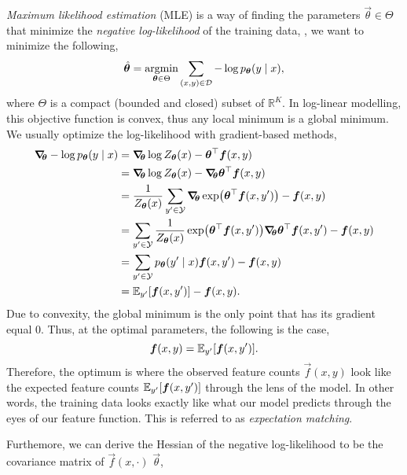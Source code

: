 \textit{Maximum likelihood estimation} (MLE) is a way of finding the parameters
$\vec{\theta}\in\Theta$ that minimize the \textit{negative log-likelihood} of
the training data, \ie, we want to minimize the following, \[
  \hat{\bm{\theta}} = \operatorname*{argmin}_{\bm{\theta}\in\Theta} \sum_{(x,y)\in\mathcal{D}} -\log p_{\bm{\theta}}(y\mid x)
,\]
where $\Theta$ is a compact (bounded and closed) subset of
$\mathbb{R}^K$.
In log-linear modelling, this objective function is convex, thus any local
minimum is a global minimum. We usually optimize the log-likelihood with
gradient-based methods,
\begin{align*}
  \grad{- \log p_{\vec{\theta}}(y \mid x)}{\vec{\theta}} &= \grad{\log Z_{\vec{\theta}}(x) - \transpose{\vec{\theta}} \vec{f}(x,y)}{\vec{\theta}} \\ 
  &= \grad{\log Z_{\vec{\theta}}(x)}{\vec{\theta}} - \grad{\transpose{\vec{\theta}} \vec{f}(x,y)}{\vec{\theta}} \\
  &= \frac{1}{Z_{\vec{\theta}}(x)} \sum_{y'\in\mathcal{Y}} \grad{\exp \lft( \transpose{\vec{\theta}} \vec{f}(x,y') \rgt)}{\vec{\theta}} - \vec{f}(x,y) \\
  &= \sum_{y'\in\mathcal{Y}} \frac{1}{Z_{\vec{\theta}}(x)} \exp \lft( \transpose{\vec{\theta}} \vec{f}(x,y') \rgt) \grad{\transpose{\vec{\theta}} \vec{f}(x,y')}{\vec{\theta}} - \vec{f}(x,y) \\
  &= \sum_{y'\in\mathcal{Y}} p_{\vec{\theta}}(y'\mid x) \vec{f}(x,y') - \vec{f}(x,y) \\
  &= \E_{y'} [\vec{f}(x,y')] - \vec{f}(x,y)
.\end{align*}
Due to convexity, the global minimum is the only point that has its gradient
equal $0$. Thus, at the optimal parameters, the following is the case, \[
  \bm{f}(x,y) = \mathbb{E}_{y'} [\bm{f}(x,y')]
.\]
Therefore, the optimum is where the observed feature counts $\vec{f}(x,y)$ look
like the expected feature counts $\mathbb{E}_{y'} [\bm{f}(x,y')]$ through the lens of
the model. In other words, the training data looks exactly like what our model
predicts through the eyes of our feature function. This is referred to as
\textit{expectation matching}.

Furthemore, we can derive the Hessian of the negative log-likelihood to be the
covariance matrix of $\vec{f}(x,\cdot)$ \wrt $\vec{\theta}$,

